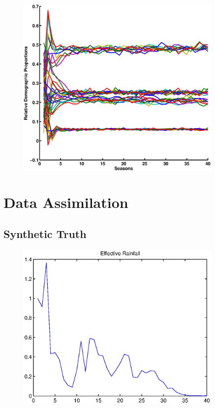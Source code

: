 \documentclass[fleqn, letterpaper]{amsart}
\begin{document}
\begin{figure}
\includegraphics[width=0.9\textwidth]{relprop}
\end{figure}
\section{Data Assimilation}
\subsection{Synthetic Truth}
\begin{figure}
\begin{center}
\includegraphics[width=0.9\textwidth]{rforcing}
\end{center}
\end{figure}
\end{document}
